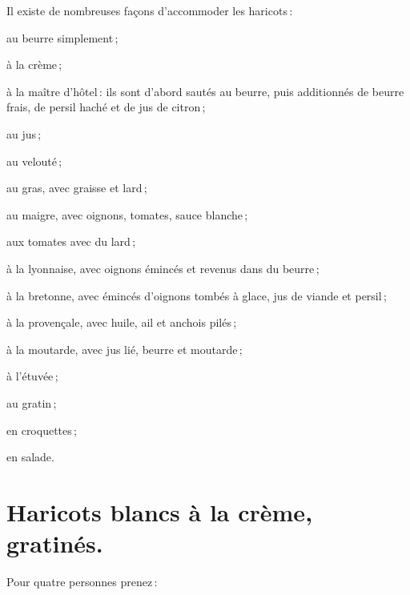 Il existe de nombreuses façons d'accommoder les haricots :

au beurre simplement ;

à la crème ;

à la maître d'hôtel : ils sont d'abord sautés au beurre, puis additionnés de
beurre frais, de persil haché et de jus de citron ;

au jus ;

au velouté ;

au gras, avec graisse et lard ;

au maigre, avec oignons, tomates, sauce blanche ;

aux tomates avec du lard ;

à la lyonnaise, avec oignons émincés et revenus dans du beurre ;

à la bretonne, avec émincés d'oignons tombés à glace, jus de viande et
persil ;

à la provençale, avec huile, ail et anchois pilés ;

à la moutarde, avec jus lié, beurre et moutarde ;

à l'étuvée ;

au gratin ;

en croquettes ;

en salade.

\section*{\centering Haricots blancs à la crème, gratinés.}
{}

Pour quatre personnes prenez :

